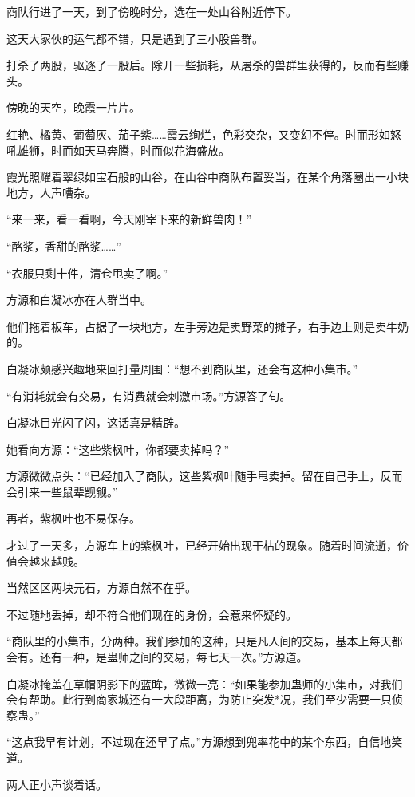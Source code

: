 
\begin{this_body}

商队行进了一天，到了傍晚时分，选在一处山谷附近停下。

这天大家伙的运气都不错，只是遇到了三小股兽群。

打杀了两股，驱逐了一股后。除开一些损耗，从屠杀的兽群里获得的，反而有些赚头。

傍晚的天空，晚霞一片片。

红艳、橘黄、葡萄灰、茄子紫……霞云绚烂，色彩交杂，又变幻不停。时而形如怒吼雄狮，时而如天马奔腾，时而似花海盛放。

霞光照耀着翠绿如宝石般的山谷，在山谷中商队布置妥当，在某个角落圈出一小块地方，人声嘈杂。

“来一来，看一看啊，今天刚宰下来的新鲜兽肉！”

“酪浆，香甜的酪浆……”

“衣服只剩十件，清仓甩卖了啊。”

方源和白凝冰亦在人群当中。

他们拖着板车，占据了一块地方，左手旁边是卖野菜的摊子，右手边上则是卖牛奶的。

白凝冰颇感兴趣地来回打量周围：“想不到商队里，还会有这种小集市。”

“有消耗就会有交易，有消费就会刺激市场。”方源答了句。

白凝冰目光闪了闪，这话真是精辟。

她看向方源：“这些紫枫叶，你都要卖掉吗？”

方源微微点头：“已经加入了商队，这些紫枫叶随手甩卖掉。留在自己手上，反而会引来一些鼠辈觊觎。”

再者，紫枫叶也不易保存。

才过了一天多，方源车上的紫枫叶，已经开始出现干枯的现象。随着时间流逝，价值会越来越贱。

当然区区两块元石，方源自然不在乎。

不过随地丢掉，却不符合他们现在的身份，会惹来怀疑的。

“商队里的小集市，分两种。我们参加的这种，只是凡人间的交易，基本上每天都会有。还有一种，是蛊师之间的交易，每七天一次。”方源道。

白凝冰掩盖在草帽阴影下的蓝眸，微微一亮：“如果能参加蛊师的小集市，对我们会有帮助。此行到商家城还有一大段距离，为防止突发*况，我们至少需要一只侦察蛊。”

“这点我早有计划，不过现在还早了点。”方源想到兜率花中的某个东西，自信地笑道。

两人正小声谈着话。


\end{this_body}
